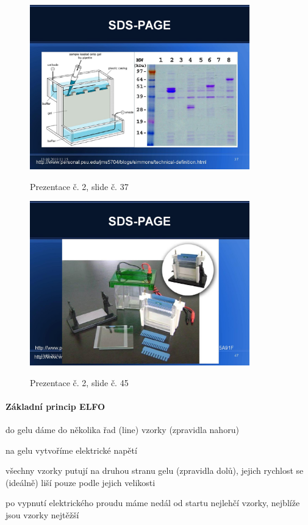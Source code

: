 \documentclass[DIV=8]{scrreprt}
\begin{document}
\begin{figure}
    \caption{Prezentace č. 2, slide č. 37}
    \includegraphics[width=0.85\textwidth]{slides-2/slide-37.jpg}
    \centering
    \label{slides-2-slide-37}
\end{figure}
\begin{figure}
    \caption{Prezentace č. 2, slide č. 45}
    \includegraphics[width=0.85\textwidth]{slides-2/slide-45.jpg}
    \centering
    \label{slides-2-slide-45}
\end{figure}

\paragraph{Základní princip ELFO}
\begin{myEnumerate}[nosep]
    \item do gelu dáme do několika řad (line) vzorky (zpravidla nahoru)
    \item na gelu vytvoříme elektrické napětí
    \item všechny vzorky putují na druhou stranu gelu (zpravidla dolů), jejich rychlost se (ideálně) liší pouze podle jejich velikosti
    \item po vypnutí elektrického proudu máme nedál od startu nejlehčí vzorky, nejblíže jsou vzorky nejtěžší
\end{myEnumerate}
\end{document}

